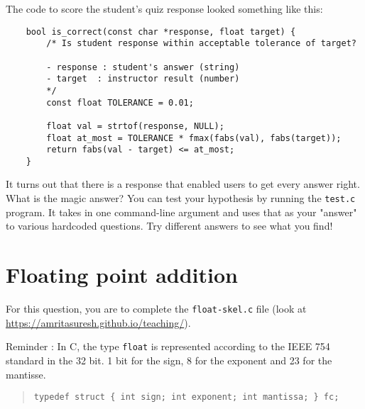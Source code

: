 \documentclass[11pt]{article}
\begin{document}
The code to score the student's quiz response looked something like this:
\begin{verbatim}
	bool is_correct(const char *response, float target) {
		/* Is student response within acceptable tolerance of target?
		
		- response : student's answer (string)
		- target  : instructor result (number)
		*/
		const float TOLERANCE = 0.01;
		
		float val = strtof(response, NULL);
		float at_most = TOLERANCE * fmax(fabs(val), fabs(target));
		return fabs(val - target) <= at_most;
	}
\end{verbatim}

	 It turns out that there is a response that enabled users to get every answer right. What is the magic answer? You can test your hypothesis by running the \texttt{test.c} program. It takes in one command-line argument and uses that as your "answer" to various hardcoded questions. Try different answers to see what you find!


\section{Floating point addition}

For this question, you are to complete the \texttt{float-skel.c} file (look at \url{https://amritasuresh.github.io/teaching/}).


Reminder : In C, the type \texttt{float} is represented according to the IEEE 754 standard in the 32 bit. 1 bit for the sign, 8 for the exponent and 23 for the mantisse. 

\begin{quote}
\verb+typedef struct { int sign; int exponent; int mantissa; } fc;+
\end{quote}
\end{document}
